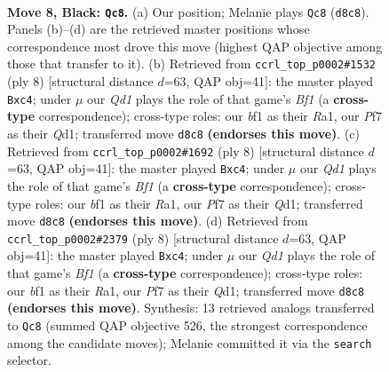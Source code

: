 \documentclass[11pt]{article}
\begin{document}
\begin{figure}[p]\centering
\begin{subfigure}{0.46\textwidth}\centering
\resizebox{\linewidth}{!}{%
\newchessgame
\chessboard[
  setfen={rn1qkb1r/pp2ppp1/2p2nbp/8/2PP1P1P/6N1/PP4P1/R1BQKBNR b KQkq - 0 8},
  showmover=false,
  pgfstyle=straightmove, color=movearrow, markmove={d8-c8}
]}
\caption{}
\end{subfigure}\hfill
\begin{subfigure}{0.46\textwidth}\centering
\resizebox{\linewidth}{!}{%
\newchessgame
\chessboard[
  setfen={rnbqkb1r/ppp2ppp/4pn2/8/2pP4/4PN2/PP3PPP/RNBQKB1R w KQkq - 0 5},
  showmover=false,
  pgfstyle=straightmove, color=movearrow, markmove={f1-c4}
]}
\caption{}
\end{subfigure}
\\[4pt]
\begin{subfigure}{0.46\textwidth}\centering
\resizebox{\linewidth}{!}{%
\newchessgame
\chessboard[
  setfen={rnbqkb1r/ppp2ppp/4pn2/8/2pP4/4PN2/PP3PPP/RNBQKB1R w KQkq - 0 5},
  showmover=false,
  pgfstyle=straightmove, color=movearrow, markmove={f1-c4}
]}
\caption{}
\end{subfigure}\hfill
\begin{subfigure}{0.46\textwidth}\centering
\resizebox{\linewidth}{!}{%
\newchessgame
\chessboard[
  setfen={rnbqkb1r/ppp2ppp/4pn2/8/2pP4/4PN2/PP3PPP/RNBQKB1R w KQkq - 0 5},
  showmover=false,
  pgfstyle=straightmove, color=movearrow, markmove={f1-c4}
]}
\caption{}
\end{subfigure}
\caption{\textbf{Move 8, Black: \texttt{Qc8}.} (a) Our position; Melanie plays \texttt{Qc8} (\texttt{d8c8}). Panels (b)--(d) are the retrieved master positions whose correspondence most drove this move (highest QAP objective among those that transfer to it). (b) Retrieved from \texttt{ccrl\_top\_p0002\#1532} (ply 8) [structural distance $d$=63, QAP obj=41]: the master played \texttt{Bxc4}; under $\mu$ our \emph{Qd1} plays the role of that game's \emph{Bf1} (a \textbf{cross-type} correspondence); cross-type roles: our \emph{b}f1 as their \emph{R}a1, our \emph{P}f7 as their \emph{Q}d1; transferred move \texttt{d8c8} \textbf{(endorses this move)}. (c) Retrieved from \texttt{ccrl\_top\_p0002\#1692} (ply 8) [structural distance $d$=63, QAP obj=41]: the master played \texttt{Bxc4}; under $\mu$ our \emph{Qd1} plays the role of that game's \emph{Bf1} (a \textbf{cross-type} correspondence); cross-type roles: our \emph{b}f1 as their \emph{R}a1, our \emph{P}f7 as their \emph{Q}d1; transferred move \texttt{d8c8} \textbf{(endorses this move)}. (d) Retrieved from \texttt{ccrl\_top\_p0002\#2379} (ply 8) [structural distance $d$=63, QAP obj=41]: the master played \texttt{Bxc4}; under $\mu$ our \emph{Qd1} plays the role of that game's \emph{Bf1} (a \textbf{cross-type} correspondence); cross-type roles: our \emph{b}f1 as their \emph{R}a1, our \emph{P}f7 as their \emph{Q}d1; transferred move \texttt{d8c8} \textbf{(endorses this move)}. Synthesis: 13 retrieved analogs transferred to \texttt{Qc8} (summed QAP objective 526, the strongest correspondence among the candidate moves); Melanie committed it via the \texttt{search} selector.}
\label{fig:thought-m15}
\end{figure}
\end{document}
